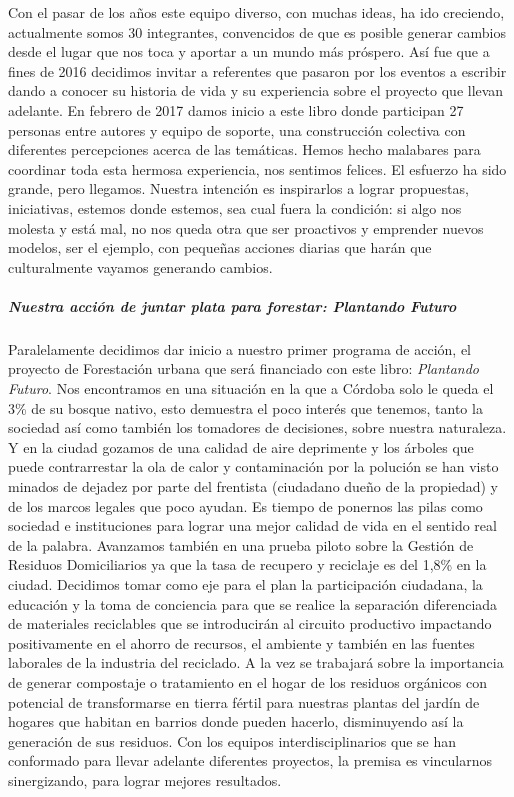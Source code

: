 \documentclass[
]{article}
\begin{document}
Con el pasar de los años este equipo diverso, con muchas ideas, ha ido
creciendo, actualmente somos 30 integrantes, convencidos de que es
posible generar cambios desde el lugar que nos toca y aportar a un mundo
más próspero. Así fue que a fines de 2016 decidimos invitar a referentes
que pasaron por los eventos a escribir dando a conocer su historia de
vida y su experiencia sobre el proyecto que llevan adelante. En febrero
de 2017 damos inicio a este libro donde participan 27 personas entre
autores y equipo de soporte, una construcción colectiva con diferentes
percepciones acerca de las temáticas. Hemos hecho malabares para
coordinar toda esta hermosa experiencia, nos sentimos felices. El
esfuerzo ha sido grande, pero llegamos. Nuestra intención es inspirarlos
a lograr propuestas, iniciativas, estemos donde estemos, sea cual fuera
la condición: si algo nos molesta y está mal, no nos queda otra que ser
proactivos y emprender nuevos modelos, ser el ejemplo, con pequeñas
acciones diarias que harán que culturalmente vayamos generando cambios.

\hypertarget{nuestra-acciuxf3n-de-juntar-plata-para-forestar-plantando-futuro}{%
\subparagraph{\texorpdfstring{Nuestra acción de juntar plata para
forestar: \emph{Plantando
Futuro}}{Nuestra acción de juntar plata para forestar: Plantando Futuro}}\label{nuestra-acciuxf3n-de-juntar-plata-para-forestar-plantando-futuro}}

Paralelamente decidimos dar inicio a nuestro primer programa de acción,
el proyecto de Forestación urbana que será financiado con este libro:
\emph{Plantando Futuro}. Nos encontramos en una situación en la que a
Córdoba solo le queda el 3\% de su bosque nativo, esto demuestra el poco
interés que tenemos, tanto la sociedad así como también los tomadores de
decisiones, sobre nuestra naturaleza. Y en la ciudad gozamos de una
calidad de aire deprimente y los árboles que puede contrarrestar la ola
de calor y contaminación por la polución se han visto minados de dejadez
por parte del frentista (ciudadano dueño de la propiedad) y de los
marcos legales que poco ayudan. Es tiempo de ponernos las pilas como
sociedad e instituciones para lograr una mejor calidad de vida en el
sentido real de la palabra. Avanzamos también en una prueba piloto sobre
la Gestión de Residuos Domiciliarios ya que la tasa de recupero y
reciclaje es del 1,8\% en la ciudad. Decidimos tomar como eje para el
plan la participación ciudadana, la educación y la toma de conciencia
para que se realice la separación diferenciada de materiales reciclables
que se introducirán al circuito productivo impactando positivamente en
el ahorro de recursos, el ambiente y también en las fuentes laborales de
la industria del reciclado. A la vez se trabajará sobre la importancia
de generar compostaje o tratamiento en el hogar de los residuos
orgánicos con potencial de transformarse en tierra fértil para nuestras
plantas del jardín de hogares que habitan en barrios donde pueden
hacerlo, disminuyendo así la generación de sus residuos. Con los equipos
interdisciplinarios que se han conformado para llevar adelante
diferentes proyectos, la premisa es vincularnos sinergizando, para
lograr mejores resultados.
\end{document}
